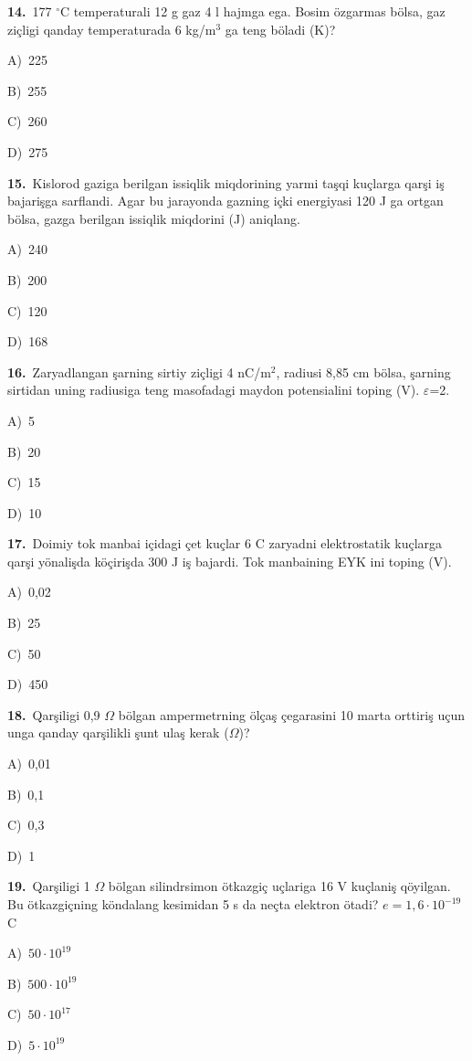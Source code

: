 \documentclass[11pt,a4paper]{article}
\newcommand{\opt}[2]{\hspace*{4mm}#1)\ #2\par}
\begin{document}
\noindent\begin{minipage}{\linewidth}
\textbf{14.}\ 177 $^\circ$C temperaturali 12 g gaz 4 l hajmga ega. Bosim özgarmas bölsa, gaz ziçligi qanday temperaturada 6 kg/m$^{3}$ ga teng böladi (K)?\par\smallskip
\opt{A}{225}
\opt{B}{255}
\opt{C}{260}
\opt{D}{275}
\end{minipage}\vspace{9pt}\par
\noindent\begin{minipage}{\linewidth}
\textbf{15.}\ Kislorod gaziga berilgan issiqlik miqdorining yarmi taşqi kuçlarga qarşi iş bajarişga sarflandi. Agar bu jarayonda gazning içki energiyasi 120 J ga ortgan bölsa, gazga berilgan issiqlik miqdorini (J) aniqlang.\par\smallskip
\opt{A}{240}
\opt{B}{200}
\opt{C}{120}
\opt{D}{168}
\end{minipage}\vspace{9pt}\par
\noindent\begin{minipage}{\linewidth}
\textbf{16.}\ Zaryadlangan şarning sirtiy ziçligi 4 nC/m$^{2}$, radiusi 8,85 cm bölsa, şarning sirtidan uning radiusiga teng masofadagi maydon potensialini toping (V). $\varepsilon$=2.\par\smallskip
\opt{A}{5}
\opt{B}{20}
\opt{C}{15}
\opt{D}{10}
\end{minipage}\vspace{9pt}\par
\noindent\begin{minipage}{\linewidth}
\textbf{17.}\ Doimiy tok manbai içidagi çet kuçlar 6 C zaryadni elektrostatik kuçlarga qarşi yönalişda köçirişda 300 J iş bajardi. Tok manbaining EYK ini toping (V).\par\smallskip
\opt{A}{0,02}
\opt{B}{25}
\opt{C}{50}
\opt{D}{450}
\end{minipage}\vspace{9pt}\par
\noindent\begin{minipage}{\linewidth}
\textbf{18.}\ Qarşiligi 0,9 $\Omega$ bölgan ampermetrning ölçaş çegarasini 10 marta orttiriş uçun unga qanday qarşilikli şunt ulaş kerak ($\Omega$)?\par\smallskip
\opt{A}{0,01}
\opt{B}{0,1}
\opt{C}{0,3}
\opt{D}{1}
\end{minipage}\vspace{9pt}\par
\noindent\begin{minipage}{\linewidth}
\textbf{19.}\ Qarşiligi 1 $\Omega$ bölgan silindrsimon ötkazgiç uçlariga 16 V kuçlaniş qöyilgan. Bu ötkazgiçning köndalang kesimidan 5 s da neçta elektron ötadi? $e = 1{,}6\cdot10^{-19}$ C\par\smallskip
\opt{A}{$50\cdot10^{19}$}
\opt{B}{$500\cdot10^{19}$}
\opt{C}{$50\cdot10^{17}$}
\opt{D}{$5\cdot10^{19}$}
\end{minipage}\vspace{9pt}\par
\end{document}
